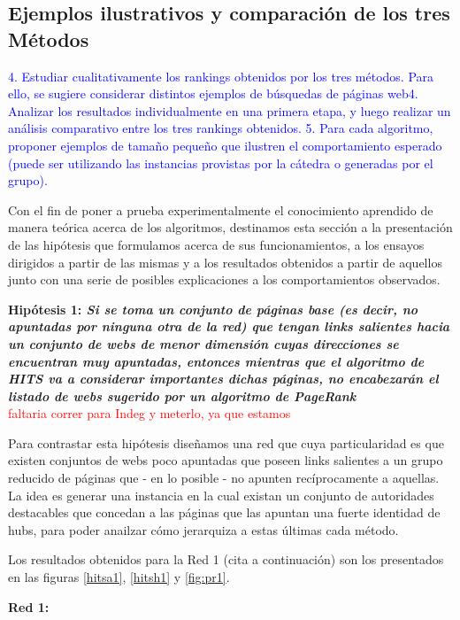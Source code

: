 \documentclass[a4paper]{article}
\begin{document}
\subsection{Ejemplos ilustrativos y comparaci\'on de los tres M\'etodos}

\textcolor{blue}{4. Estudiar cualitativamente los rankings obtenidos por los tres m\'etodos. Para ello, se sugiere
considerar distintos ejemplos de b\'usquedas de p\'aginas web4. Analizar los resultados
individualmente en una primera etapa, y luego realizar un an\'alisis comparativo entre
los tres rankings obtenidos.
5. Para cada algoritmo, proponer ejemplos de tama\~no peque\~no que ilustren el comportamiento
esperado (puede ser utilizando las instancias provistas por la c\'atedra o generadas
por el grupo).}

Con el fin de poner a prueba experimentalmente el conocimiento aprendido de manera teórica acerca de los algoritmos, destinamos esta sección a la presentación de las hipótesis que formulamos acerca de sus funcionamientos, a los ensayos dirigidos a partir de las mismas y a los resultados obtenidos a partir de aquellos junto con una serie de posibles explicaciones a los comportamientos observados.

\textbf{Hipótesis 1: \itshape{Si se toma un conjunto de páginas base (es decir, no apuntadas por ninguna otra de la red) que tengan links salientes hacia un conjunto de webs de menor dimensión cuyas direcciones se encuentran muy apuntadas, entonces mientras que el algoritmo de HITS va a considerar importantes dichas páginas, no encabezarán el listado de webs sugerido por un algoritmo de PageRank}}\\
\textcolor{red}{faltaria correr para Indeg y meterlo, ya que estamos}

Para contrastar esta hipótesis diseñamos una red que cuya particularidad es que existen conjuntos de webs poco apuntadas que poseen links salientes a un grupo reducido de páginas que - en lo posible - no apunten recíprocamente a aquellas. La idea es generar una instancia en la cual existan un conjunto de autoridades destacables  que concedan a las páginas que las apuntan una fuerte identidad de hubs, para poder anailzar cómo jerarquiza a estas últimas cada método.

Los resultados obtenidos para la Red 1  (cita a continuación) son los presentados en las figuras \ref{hitsa1}, \ref{hitsh1} y \ref{fig:pr1}.

\textbf{Red 1:}\\
\end{document}
